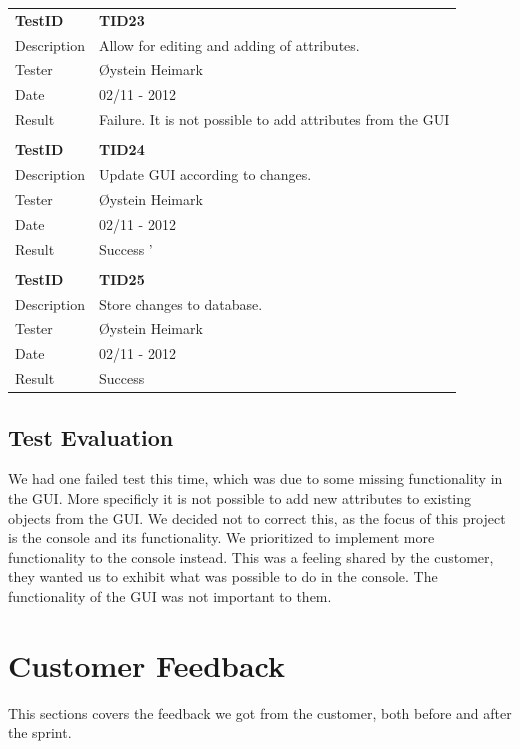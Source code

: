 \begin{table}
\begin{tabular}{ l p{13cm} }
\bf{TestID}		&\bf{TID23}			\\
Description	&Allow for editing and adding of attributes.	\\
Tester		&Øystein Heimark	\\
Date			&02/11 - 2012	\\
Result		&Failure. It is not possible to add attributes from the GUI			\\
\hline \\ [-2.0ex]

\bf{TestID}		&\bf{TID24}			\\
Description	&Update GUI according to changes.	\\
Tester		&Øystein Heimark	\\
Date			&02/11 - 2012	\\
Result		&Success		'	\\
\hline \\ [-2.0ex]

\bf{TestID}		&\bf{TID25}			\\
Description	&Store changes to database.\\
Tester		&Øystein Heimark	\\
Date			&02/11 - 2012	\\
Result		&Success			\\
\hline

\end{tabular}
\label{table:sp3testresults}
\end{table}

\subsection{Test Evaluation}
We had one failed test this time, which was due to some missing functionality in the GUI. More specificly it is not possible to add new attributes to existing objects from the GUI. We decided not to correct this, as the focus of this project is the console and its functionality. We prioritized to implement more functionality to the console instead. This was a feeling shared by the customer, they wanted us to exhibit what was possible to do in the console. The functionality of the GUI was not important to them.

\section{Customer Feedback}
This sections covers the feedback we got from the customer, both before and after the sprint.


